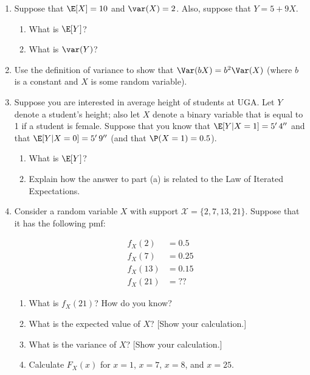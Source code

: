 \documentclass[
  letterpaper,
  DIV=11,
  numbers=noendperiod]{scrreprt}
\begin{document}
\begin{enumerate}
\def\labelenumi{\arabic{enumi}.}
\item
  Suppose that \(\E[X] = 10\) and \(\var(X) = 2\). Also, suppose that
  \(Y=5 + 9 X\).

  \begin{enumerate}
  \def\labelenumii{\alph{enumii})}
  \item
    What is \(\E[Y]\)?
  \item
    What is \(\var(Y)\)?
  \end{enumerate}
\item
  Use the definition of variance to show that \(\Var(bX) = b^2 \Var(X)\)
  (where \(b\) is a constant and \(X\) is some random variable).
\item
  Suppose you are interested in average height of students at UGA. Let
  \(Y\) denote a student's height; also let \(X\) denote a binary
  variable that is equal to 1 if a student is female. Suppose that you
  know that \(\E[Y|X=1] = 5' \,4''\) and that \(\E[Y|X=0] = 5' \,9''\)
  (and that \(\P(X=1) = 0.5\)).

  \begin{enumerate}
  \def\labelenumii{\alph{enumii})}
  \item
    What is \(\E[Y]\)?
  \item
    Explain how the answer to part (a) is related to the Law of Iterated
    Expectations.
  \end{enumerate}
\item
  Consider a random variable \(X\) with support
  \(\mathcal{X} = \{2,7,13,21\}\). Suppose that it has the following
  pmf:

  \[
      \begin{aligned}
       f_X(2) &= 0.5 \\
       f_X(7) &= 0.25 \\
       f_X(13) &= 0.15 \\
       f_X(21) &= ??
     \end{aligned}
   \]

  \begin{enumerate}
  \def\labelenumii{\alph{enumii})}
  \item
    What is \(f_X(21)\)? How do you know?
  \item
    What is the expected value of \(X\)? {[}Show your calculation.{]}
  \item
    What is the variance of \(X\)? {[}Show your calculation.{]}
  \item
    Calculate \(F_X(x)\) for \(x=1\), \(x=7\), \(x=8\), and \(x=25\).
  \end{enumerate}
\end{enumerate}
\end{document}
